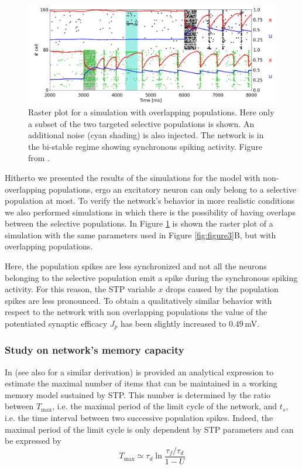\documentclass[a4paper, 12pt, twoside, openright]{book}
\begin{document}
\begin{figure}[H]
    \centering
    \includegraphics[width=0.9\columnwidth]{figures/fig5.png}
    \caption{Raster plot for a simulation with overlapping populations. Here only a subset of the two targeted selective populations is shown. An additional noise (cyan shading) is also injected. The network is in the bi-stable regime showing synchronous spiking activity. Figure from \cite{Tiddia2022_WM}.}
    \label{fig:figure5}
\end{figure}

Hitherto we presented the results of the simulations for the model with non-overlapping populations, ergo an excitatory neuron can only belong to a selective population at most. To verify the network's behavior in more realistic conditions we also performed simulations in which there is the possibility of having overlaps between the selective populations. In Figure \ref{fig:figure5} is shown the raster plot of a simulation with the same parameters used in Figure \ref{fig:figure3}B, but with overlapping populations. 


Here, the population spikes are less synchronized and not all the neurons belonging to the selective population emit a spike during the synchronous spiking activity. For this reason, the STP variable $x$ drops caused by the population spikes are less pronounced. To obtain a qualitatively similar behavior with respect to the network with non overlapping populations the value of the potentiated synaptic efficacy $J_p$ has been slightly increased to $0.49$\,mV.


\subsubsection{Study on network's memory capacity}

In \cite{mi_katkov_tsodyks2017} (see also \cite{Taher2020} for a similar derivation) is provided an analytical expression to estimate the maximal number of items that can be maintained in a working memory model sustained by STP. This number is determined by the ratio between $T_{\text{max}}$, i.e. the maximal period of the limit cycle of the network, and $t_s$, i.e. the time interval between two successive population spikes. Indeed, the maximal period of the limit cycle is only dependent by STP parameters and can be expressed by \cite{mi_katkov_tsodyks2017}
\begin{equation}
    T_{\text{max}} \simeq \tau_d \ln \dfrac{\tau_f/\tau_d}{1-U}
    \label{eq:Tmax_WMCapacity}
\end{equation}
\end{document}
